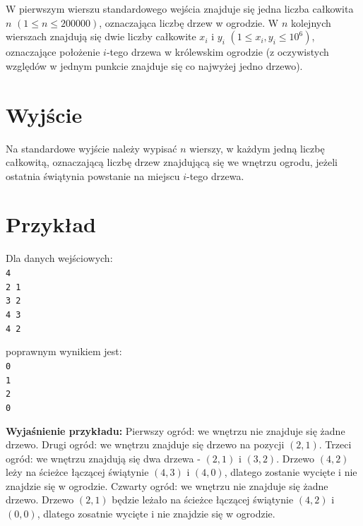 \documentclass[10pt]{article}
\begin{document}
    W pierwszym wierszu standardowego wejścia znajduje się jedna liczba całkowita $n$ $(1\leq n\leq 200000)$, oznaczająca liczbę drzew w ogrodzie. W $n$ kolejnych wierszach znajdują się dwie liczby całkowite $x_{i}$ i $y_{i}$ $(1\leq x_{i}, y_{i}\leq 10^{6})$, oznaczające położenie $i$-tego drzewa w królewskim ogrodzie (z oczywistych względów w jednym punkcie znajduje się co najwyżej jedno drzewo).


    \section*{Wyjście}
    
    Na standardowe wyjście należy wypisać $n$ wierszy, w każdym jedną liczbę całkowitą, oznaczającą liczbę drzew znajdującą się we wnętrzu ogrodu, jeżeli ostatnia świątynia powstanie na miejscu $i$-tego drzewa.


    \section*{Przykład}
    
    \noindent
    \begin{minipage}[t]{0.5\textwidth}
        Dla danych wejściowych:\vspace{1ex}\\
        \texttt{4\\2 1\\3 2\\4 3\\4 2}
    \end{minipage}
    \begin{minipage}[t]{0.5\textwidth}
        poprawnym wynikiem jest:\vspace{1ex}\\
        \texttt{0\\1\\2\\0}
    \end{minipage}
    
    \vspace{2ex}
    \noindent\textbf{Wyjaśnienie przykładu:} Pierwszy ogród: we wnętrzu nie znajduje się żadne drzewo. Drugi ogród: we wnętrzu znajduje się drzewo na pozycji $(2, 1)$. Trzeci ogród: we wnętrzu znajdują się dwa drzewa - $(2, 1)$ i $(3, 2)$. Drzewo $(4, 2)$ leży na ścieżce łączącej świątynie $(4, 3)$ i $(4, 0)$, dlatego zostanie wycięte i nie znajdzie się w ogrodzie. Czwarty ogród: we wnętrzu nie znajduje się żadne drzewo. Drzewo $(2, 1)$ będzie leżało na ścieżce łączącej świątynie $(4, 2)$ i $(0, 0)$, dlatego zosatnie wycięte i nie znajdzie się w ogrodzie.
    
\end{document}
